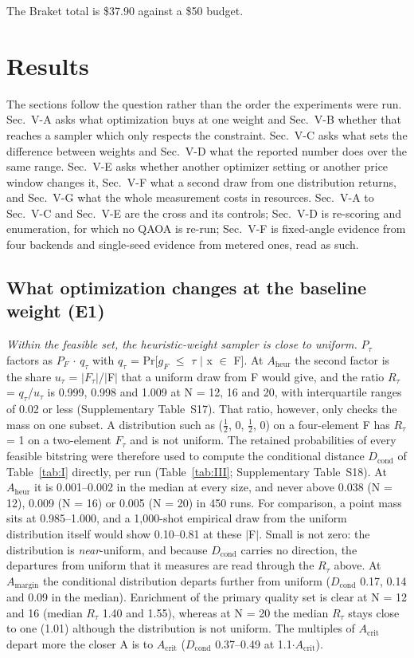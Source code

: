 \documentclass[journal]{IEEEtran}
\begin{document}
The Braket total is \$37.90 against a \$50 budget.


\section{Results}


The sections follow the question rather than the order the experiments were run. Sec.~V-A asks what optimization buys at one weight and Sec.~V-B whether that reaches a sampler which only respects the constraint. Sec.~V-C asks what sets the difference between weights and Sec.~V-D what the reported number does over the same range. Sec.~V-E asks whether another optimizer setting or another price window changes it, Sec.~V-F what a second draw from one distribution returns, and Sec.~V-G what the whole measurement costs in resources. Sec.~V-A to Sec.~V-C and Sec.~V-E are the cross and its controls; Sec.~V-D is re-scoring and enumeration, for which no QAOA is re-run; Sec.~V-F is fixed-angle evidence from four backends and single-seed evidence from metered ones, read as such.


\subsection{What optimization changes at the baseline weight (E1)}


\textit{Within the feasible set, the heuristic-weight sampler is close to uniform.} $P_{\tau}$ factors as $P_{F}$ $\cdot$ $q_{\tau}$ with $q_{\tau}$ = Pr[$g_{F}$ $\leq$ $\tau$ $|$ x $\in$ F]. At $A_{\mathrm{heur}}$ the second factor is the share $u_{\tau}$ = $|$$F_{\tau}$$|$/$|$F$|$ that a uniform draw from F would give, and the ratio $R_{\tau}$ = $q_{\tau}$/$u_{\tau}$ is 0.999, 0.998 and 1.009 at N = 12, 16 and 20, with interquartile ranges of 0.02 or less (Supplementary Table~S17). That ratio, however, only checks the mass on one subset. A distribution such as ($\tfrac{1}{2}$, 0, $\tfrac{1}{2}$, 0) on a four-element F has $R_{\tau}$ = 1 on a two-element $F_{\tau}$ and is not uniform. The retained probabilities of every feasible bitstring were therefore used to compute the conditional distance $D_{\mathrm{cond}}$ of Table~\ref{tab:I} directly, per run (Table~\ref{tab:III}; Supplementary Table~S18). At $A_{\mathrm{heur}}$ it is 0.001--0.002 in the median at every size, and never above 0.038 (N = 12), 0.009 (N = 16) or 0.005 (N = 20) in 450 runs. For comparison, a point mass sits at 0.985--1.000, and a 1,000-shot empirical draw from the uniform distribution itself would show 0.10--0.81 at these $|$F$|$. Small is not zero: the distribution is \textit{near}-uniform, and because $D_{\mathrm{cond}}$ carries no direction, the departures from uniform that it measures are read through the $R_{\tau}$ above. At $A_{\mathrm{margin}}$ the conditional distribution departs further from uniform ($D_{\mathrm{cond}}$ 0.17, 0.14 and 0.09 in the median). Enrichment of the primary quality set is clear at N = 12 and 16 (median $R_{\tau}$ 1.40 and 1.55), whereas at N = 20 the median $R_{\tau}$ stays close to one (1.01) although the distribution is not uniform. The multiples of $A_{\mathrm{crit}}$ depart more the closer A is to $A_{\mathrm{crit}}$ ($D_{\mathrm{cond}}$ 0.37--0.49 at 1.1$\cdot$$A_{\mathrm{crit}}$).
\end{document}
